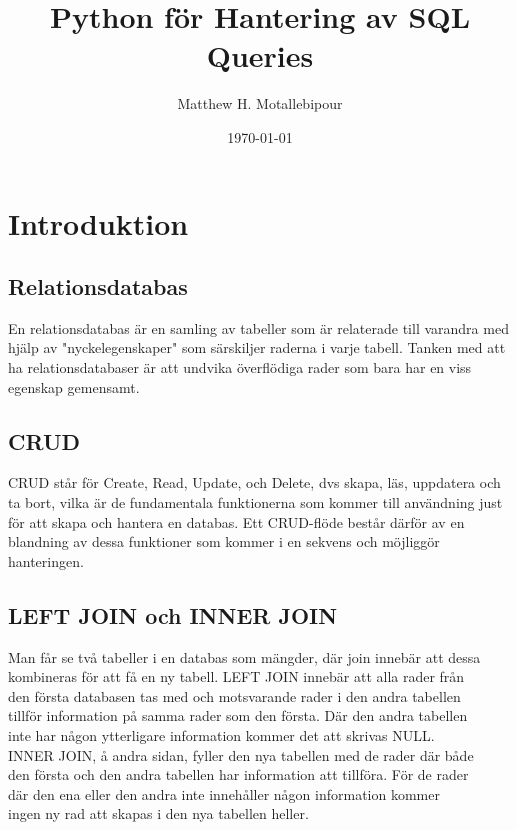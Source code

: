 \documentclass[10pt]{article}
\begin{document}

\title{Python för Hantering av SQL Queries}
\author{Matthew H. Motallebipour}
\date{\today}
\maketitle

\section{Introduktion}


\subsection{Relationsdatabas}

En relationsdatabas är en samling av tabeller som är relaterade till varandra med hjälp av "nyckelegenskaper" som särskiljer raderna i varje tabell. Tanken med att ha relationsdatabaser är att undvika överflödiga rader som bara har en viss egenskap gemensamt.


\subsection{CRUD}

CRUD står för Create, Read, Update, och Delete, dvs skapa, läs, uppdatera och ta bort, vilka är de fundamentala funktionerna som kommer till användning just för att skapa och hantera en databas. Ett CRUD-flöde består därför av en blandning av dessa funktioner som kommer i en sekvens och möjliggör hanteringen.



\subsection{LEFT JOIN och INNER JOIN}


Man får se två tabeller i en databas som mängder, där join innebär att dessa \\
kombineras för att få en ny tabell. LEFT JOIN innebär att alla rader från \\
den första databasen tas med och motsvarande rader i den andra tabellen \\
tillför information på samma rader som den första. Där den andra tabellen \\
inte har någon ytterligare information kommer det att skrivas NULL. \\
INNER JOIN, å andra sidan, fyller den nya tabellen med de rader där både \\
den första och den andra tabellen har information att tillföra. För de rader \\
där den ena eller den andra inte innehåller någon information kommer \\
ingen ny rad att skapas i den nya tabellen heller.
\end{document}
